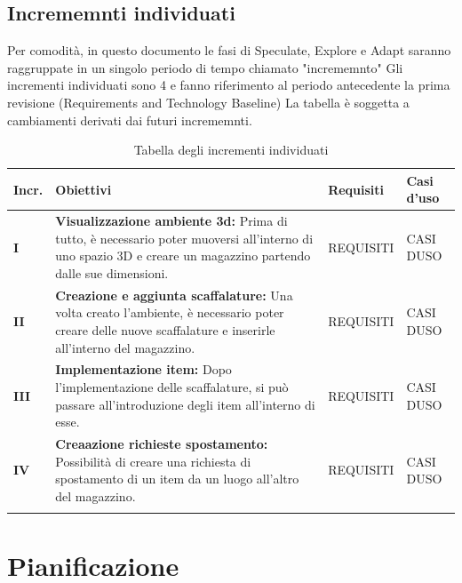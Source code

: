\subsection{Incrememnti individuati}\label{sec:modello_sviluppo:incrementi}
Per comodità, in questo documento le fasi di Speculate, Explore e Adapt saranno raggruppate in un singolo periodo di tempo chiamato "incrememnto"
Gli incrementi individuati sono 4 e fanno riferimento al periodo antecedente la prima revisione (Requirements and Technology Baseline)
La tabella è soggetta a cambiamenti derivati dai futuri incrememnti.
\begin{xltabular}{\textwidth}{p{0.05\textwidth} | X | X | X}

    \textbf{\color{white} Incr.} & \textbf{\color{white} Obiettivi} & \textbf{\color{white} Requisiti} & \textbf{\color{white} Casi d'uso}\\ 
    \hline
    \endhead
    
    \textbf{I} 
    & \textbf{Visualizzazione ambiente 3d:} Prima di tutto, è necessario poter muoversi all'interno di uno spazio 3D e creare un magazzino partendo dalle sue dimensioni.
    & REQUISITI
    & CASI DUSO \\
    \hline

    \textbf{II} 
    & \textbf{Creazione e aggiunta scaffalature:} Una volta creato l'ambiente, è necessario poter creare delle nuove scaffalature e inserirle all'interno del magazzino.
    & REQUISITI
    & CASI DUSO \\
    \hline

    \textbf{III} 
    & \textbf{Implementazione item:} Dopo l'implementazione delle scaffalature, si può passare all'introduzione degli item all'interno di esse.
    & REQUISITI
    & CASI DUSO \\
    \hline

    \textbf{IV} 
    & \textbf{Creaazione richieste spostamento:} Possibilità di creare una richiesta di spostamento di un item da un luogo all'altro del magazzino.
    & REQUISITI
    & CASI DUSO \\
    \hline
\caption{Tabella degli incrementi individuati}\label{tab:incrementi}
\end{xltabular}

\newpage
\section{Pianificazione}\label{sec:pianificazione}

